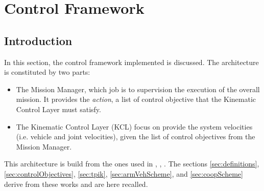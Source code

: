 

\chapter{Control Framework}
\label{chap:control}
\ifpdf
    \graphicspath{{ControlFramework/Figures/PNG/}{ControlFramework/Figures/PDF/}{ControlFramework/Figures/}}
\else
    \graphicspath{{ControlFramework/Figures/EPS/}{ControlFramework/Figures/}}
\fi

\section*{Introduction}
In this section, the control framework implemented is discussed. The architecture is constituted by two parts:
\begin{itemize}
	\item The Mission Manager, which job is to supervision the execution of the overall mission. It provides the \textit{action}, a list of control objective that the Kinematic Control Layer must satisfy.
	\item The Kinematic Control Layer (KCL) focus on provide the system velocities (i.e. vehicle and joint velocities), given the list of control objectives from the Mission Manager.
\end{itemize}

This architecture is build from the ones used in \cite{IntroMaris2}, \cite{tesiWander}, \cite{IntroRecent}. The sections \ref{sec:definitions}, \ref{sec:controlObjectives}, \ref{sec:tpik}, \ref{sec:armVehScheme}, and \ref{sec:coopScheme} derive from these works and are here recalled.

